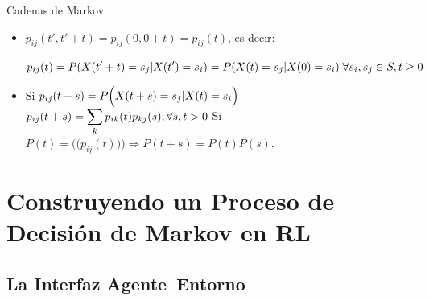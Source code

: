 \documentclass[10pt, envcountsect, handout, aspectratio=1610, hyperref={hypertexnames=true}]{beamer}
\begin{document}
\begin{frame}{Cadenas de Markov}
\begin{itemize}
	\begin{itemize}
	\item 
	 $p_{ij}(t', t'+t)=p_{ij}(0, 0+t)=p_{ij}(t)$, es decir:

		\hfil $\displaystyle p_{ij}(t)=P(X(t'+t)=s_j|X(t')=s_i)=P(X(t)=s_j|X(0)=s_i) \; \forall s_i, s_j\in S, t\geq 0 $


	\item 
		Si $\displaystyle p_{ij}(t+s)= P\Big(X(t+s)=s_j| X(t)=s_i\Big)$\\
			\hfil $\displaystyle p_{ij}(t+s)=\sum_k p_{ik}(t) p_{kj}(s) ; \forall s, t >0$ 
			\hspace{1cm}
			Si $P(t)=\Big(\!\!\Big(p_{ij}(t)\Big)\!\!\Big) \Rightarrow P(t+s)=P(t)P(s)$. 
	\end{itemize}


\end{itemize}

\end{frame}







\section{Construyendo un Proceso de Decisión de Markov en RL}







\subsection{La Interfaz Agente–Entorno}




\end{document}
